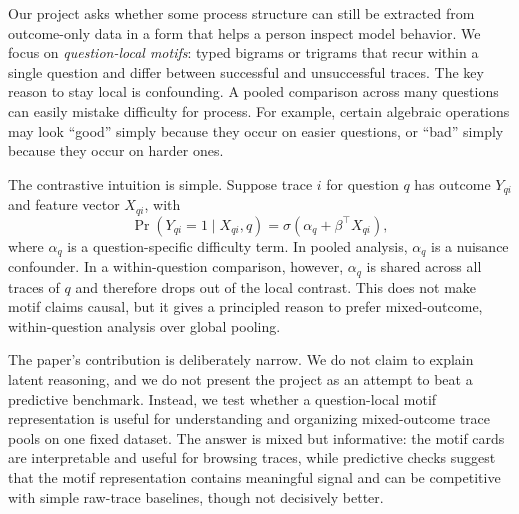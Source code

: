 \documentclass[11pt]{article}
\begin{document}
Our project asks whether some process structure can still be extracted from outcome-only data in a form that helps a person inspect model behavior. We focus on \emph{question-local motifs}: typed bigrams or trigrams that recur within a single question and differ between successful and unsuccessful traces. The key reason to stay local is confounding. A pooled comparison across many questions can easily mistake difficulty for process. For example, certain algebraic operations may look ``good'' simply because they occur on easier questions, or ``bad'' simply because they occur on harder ones.

The contrastive intuition is simple. Suppose trace $i$ for question $q$ has outcome $Y_{qi}$ and feature vector $X_{qi}$, with
\begin{equation}
\Pr(Y_{qi}=1 \mid X_{qi}, q)=\sigma(\alpha_q + \beta^\top X_{qi}),
\label{eq:fixed-effect}
\end{equation}
where $\alpha_q$ is a question-specific difficulty term. In pooled analysis, $\alpha_q$ is a nuisance confounder. In a within-question comparison, however, $\alpha_q$ is shared across all traces of $q$ and therefore drops out of the local contrast. This does not make motif claims causal, but it gives a principled reason to prefer mixed-outcome, within-question analysis over global pooling.

The paper’s contribution is deliberately narrow. We do not claim to explain latent reasoning, and we do not present the project as an attempt to beat a predictive benchmark. Instead, we test whether a question-local motif representation is useful for understanding and organizing mixed-outcome trace pools on one fixed dataset. The answer is mixed but informative: the motif cards are interpretable and useful for browsing traces, while predictive checks suggest that the motif representation contains meaningful signal and can be competitive with simple raw-trace baselines, though not decisively better.
\end{document}
